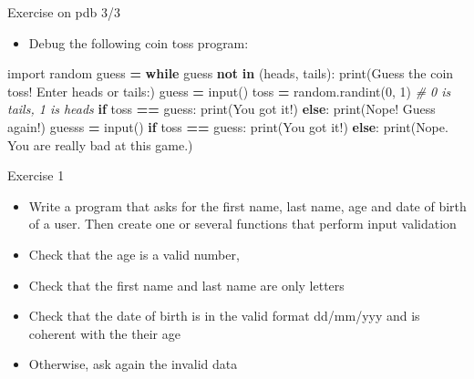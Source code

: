 \documentclass[
  8pt,
  ignorenonframetext,
]{beamer}
\newenvironment{Shaded}{\begin{snugshade}}{\end{snugshade}}
\newcommand{\BuiltInTok}[1]{#1}
\newcommand{\CommentTok}[1]{\textcolor[rgb]{0.56,0.35,0.01}{\textit{#1}}}
\newcommand{\ControlFlowTok}[1]{\textcolor[rgb]{0.13,0.29,0.53}{\textbf{#1}}}
\newcommand{\DecValTok}[1]{\textcolor[rgb]{0.00,0.00,0.81}{#1}}
\newcommand{\ImportTok}[1]{#1}
\newcommand{\KeywordTok}[1]{\textcolor[rgb]{0.13,0.29,0.53}{\textbf{#1}}}
\newcommand{\NormalTok}[1]{#1}
\newcommand{\OperatorTok}[1]{\textcolor[rgb]{0.81,0.36,0.00}{\textbf{#1}}}
\newcommand{\StringTok}[1]{\textcolor[rgb]{0.31,0.60,0.02}{#1}}
\providecommand{\tightlist}{%
  \setlength{\itemsep}{0pt}\setlength{\parskip}{0pt}}
\begin{document}
\begin{frame}[fragile]{Exercise on pdb 3/3}
\protect\hypertarget{exercise-on-pdb-33}{}
\begin{itemize}
\tightlist
\item
  Debug the following coin toss program:
\end{itemize}

\begin{Shaded}
\begin{Highlighting}[]
\ImportTok{import}\NormalTok{ random}
\NormalTok{guess }\OperatorTok{=} \StringTok{\textquotesingle{}\textquotesingle{}}
\ControlFlowTok{while}\NormalTok{ guess }\KeywordTok{not} \KeywordTok{in}\NormalTok{ (}\StringTok{\textquotesingle{}heads\textquotesingle{}}\NormalTok{, }\StringTok{\textquotesingle{}tails\textquotesingle{}}\NormalTok{):}
    \BuiltInTok{print}\NormalTok{(}\StringTok{\textquotesingle{}Guess the coin toss! Enter heads or tails:\textquotesingle{}}\NormalTok{)}
\NormalTok{    guess }\OperatorTok{=} \BuiltInTok{input}\NormalTok{()}
\NormalTok{toss }\OperatorTok{=}\NormalTok{ random.randint(}\DecValTok{0}\NormalTok{, }\DecValTok{1}\NormalTok{) }\CommentTok{\# 0 is tails, 1 is heads}
\ControlFlowTok{if}\NormalTok{ toss }\OperatorTok{==}\NormalTok{ guess:}
    \BuiltInTok{print}\NormalTok{(}\StringTok{\textquotesingle{}You got it!\textquotesingle{}}\NormalTok{)}
\ControlFlowTok{else}\NormalTok{:}
    \BuiltInTok{print}\NormalTok{(}\StringTok{\textquotesingle{}Nope! Guess again!\textquotesingle{}}\NormalTok{)}
\NormalTok{    guesss }\OperatorTok{=} \BuiltInTok{input}\NormalTok{()}
    \ControlFlowTok{if}\NormalTok{ toss }\OperatorTok{==}\NormalTok{ guess:}
        \BuiltInTok{print}\NormalTok{(}\StringTok{\textquotesingle{}You got it!\textquotesingle{}}\NormalTok{)}
    \ControlFlowTok{else}\NormalTok{:}
        \BuiltInTok{print}\NormalTok{(}\StringTok{\textquotesingle{}Nope. You are really bad at this game.\textquotesingle{}}\NormalTok{)}
\end{Highlighting}
\end{Shaded}
\end{frame}

\begin{frame}{Exercise 1}
\protect\hypertarget{exercise-1}{}
\begin{itemize}
\item
  Write a program that asks for the first name, last name, age and date
  of birth of a user. Then create one or several functions that perform
  input validation
\item
  Check that the age is a valid number,
\item
  Check that the first name and last name are only letters
\item
  Check that the date of birth is in the valid format dd/mm/yyy and is
  coherent with the their age
\item
  Otherwise, ask again the invalid data
\end{itemize}
\end{frame}
\end{document}
